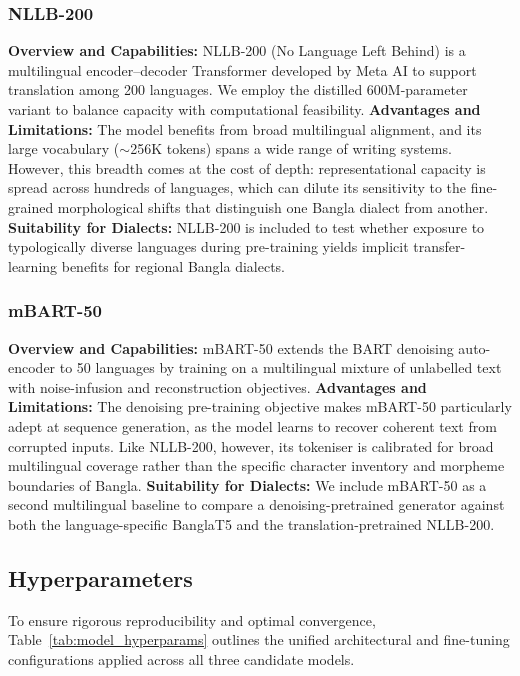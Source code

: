\documentclass[12pt,a4paper]{article}
\begin{document}
\subsubsection{NLLB-200}
\textbf{Overview and Capabilities:} NLLB-200 \cite{nllb2022} (No Language Left Behind) is a multilingual encoder--decoder Transformer developed by Meta AI to support translation among 200 languages. We employ the distilled 600M-parameter variant to balance capacity with computational feasibility.
\textbf{Advantages and Limitations:} The model benefits from broad multilingual alignment, and its large vocabulary ($\sim$256K tokens) spans a wide range of writing systems. However, this breadth comes at the cost of depth: representational capacity is spread across hundreds of languages, which can dilute its sensitivity to the fine-grained morphological shifts that distinguish one Bangla dialect from another.
\textbf{Suitability for Dialects:} NLLB-200 is included to test whether exposure to typologically diverse languages during pre-training yields implicit transfer-learning benefits for regional Bangla dialects.

\subsubsection{mBART-50}
\textbf{Overview and Capabilities:} mBART-50 \cite{tang2020multilingual} extends the BART \cite{lewis2020bart} denoising auto-encoder to 50 languages by training on a multilingual mixture of unlabelled text with noise-infusion and reconstruction objectives.
\textbf{Advantages and Limitations:} The denoising pre-training objective makes mBART-50 particularly adept at sequence generation, as the model learns to recover coherent text from corrupted inputs. Like NLLB-200, however, its tokeniser is calibrated for broad multilingual coverage rather than the specific character inventory and morpheme boundaries of Bangla.
\textbf{Suitability for Dialects:} We include mBART-50 as a second multilingual baseline to compare a denoising-pretrained generator against both the language-specific BanglaT5 and the translation-pretrained NLLB-200.

\subsection{Hyperparameters}
To ensure rigorous reproducibility and optimal convergence, Table~\ref{tab:model_hyperparams} outlines the unified architectural and fine-tuning configurations applied across all three candidate models.
\end{document}
